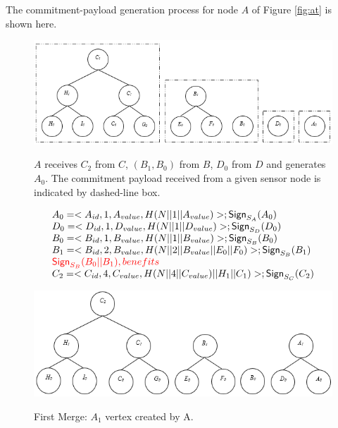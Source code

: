 			\begin{exmp} The commitment-payload generation process for node $A$ of Figure \ref{fig:at} is shown here.\\
				\begin{figure}[h!]
					\centering
					\includegraphics[scale = 1]{images/commitment-tree-example-1.png}\\
					\caption{$A$ receives $C_{2}$ from $C$, $(B_{1},B_{0})$ from $B$, $D_{0}$ from $D$ and generates $A_{0}$. The commitment payload received from a given sensor node is indicated by dashed-line box.}
					\label{fig:commitment-tree-example-1}
				\end{figure}
				\begin{equation}
					\begin{array}{l}
						A_{0} = <A_{id}, 1, A_{value}, H(N||1||A_{value})>; \textsf{Sign}_{S_{A}}(A_{0}) \\
						D_{0} = <D_{id}, 1, D_{value}, H(N||1||D_{value})>; \textsf{Sign}_{S_{D}}(D_{0})\\
						B_{0} = <B_{id}, 1, B_{value}, H(N||1||B_{value})>; \textsf{Sign}_{S_{B}}(B_{0})\\
						B_{1} = <B_{id}, 2, B_{value}, H(N||2||B_{value}||E_{0}||F_{0})>; \textsf{Sign}_{S_{B}}(B_{1})\\
						\textcolor{red}{\textsf{Sign}_{S_{B}}(B_{0} || B_{1}), benefits}\\
						C_{2} = <C_{id}, 4, C_{value}, H(N||4||C_{value})||H_{1}||C_{1})>; \textsf{Sign}_{S_{C}}(C_{2})\\
						\end{array}
				\end{equation}

				\begin{figure}[h!]
					\centering
					\includegraphics[scale = 1]{images/commitment-tree-example-2.png}\\
					\caption{First Merge: $A_{1}$ vertex created by A.}
					\label{fig:commitment-tree-example-2}
				\end{figure}


\end{exmp}
